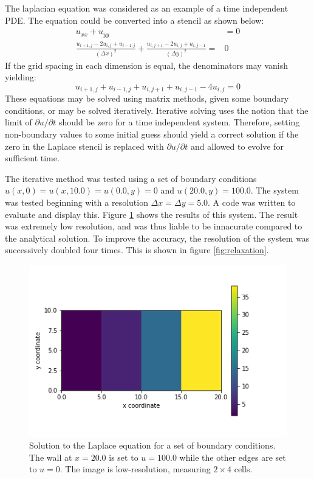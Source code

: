 \documentclass[twocolumn]{article}
\begin{document}
The laplacian equation was considered as an example of a time independent PDE. The equation could be converted into a stencil as shown below:
\begin{equation}
\begin{split}
u_{xx} + u_{yy} &= 0 \\
\frac{u_{i+1,j} - 2u_{i,j} + u_{i-1,j}}{(\Delta x)^2} + \frac{u_{i,j+1} - 2u_{i,j} + u_{i,j-1}}{(\Delta{y})^2} =&0 
\end{split}
\end{equation}
If the grid spacing in each dimension is equal, the denominators may vanish yielding:
\begin{equation}
u_{i+1,j} + u_{i-1,j} + u_{i,j+1} + u_{i,j-1} - 4u_{i,j}=0
\end{equation}
These equations may be solved using matrix methods, given some boundary conditions, or may be solved iteratively. Iterative solving uses the notion that the limit of $\partial u/ \partial t$ should be zero for a time independent system. Therefore, setting non-boundary values to some initial guess should yield a correct solution if the zero in the Laplace stencil is replaced with  $\partial u/ \partial t$ and allowed to evolve for sufficient time. 

The iterative method was tested using a set of boundary conditions $u(x,0) = u(x,10.0) = u(0.0,y)=0$ and $u(20.0,y)=100.0$. The system was tested beginning with a resolution $\Delta x = \Delta y = 5.0$. A code was written to evaluate and display this. Figure \ref{fig:low_res_iterative} shows the results of this system. The result was extremely low resolution, and was thus liable to be innacurate compared to the analytical solution. To improve the accuracy, the resolution of the system was successively doubled four times. This is shown in figure \ref{fig:relaxation}. 

\begin{figure}
\centering
\includegraphics[width=\linewidth]{low_res_iterative}
\caption{Solution to the Laplace equation for a set of boundary conditions. The wall at $x=20.0$ is set to $u=100.0$ while the other edges are set to $u=0$. The image is low-resolution, measuring $2\times4$ cells.}
\label{fig:low_res_iterative}
\end{figure}
\end{document}
